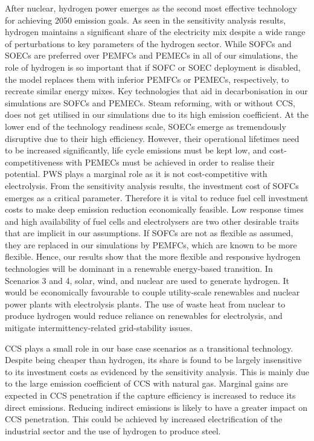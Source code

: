After nuclear, hydrogen power emerges as the second most effective technology for achieving 2050 emission goals. As seen in the sensitivity analysis results, hydrogen maintains a significant share of the electricity mix despite a wide range of perturbations to key parameters of the hydrogen sector. While \gls{SOFC}s and \gls{SOEC}s are preferred over \gls{PEMFC}s and \gls{PEMEC}s in all of our simulations, the role of hydrogen is so important that if \gls{SOFC} or \gls{SOEC} deployment is disabled, the model replaces them with inferior \gls{PEMFC}s or \gls{PEMEC}s, respectively, to recreate similar energy mixes. Key technologies that aid in decarbonisation in our simulations are \gls{SOFC}s and \gls{PEMEC}s. Steam reforming, with or without CCS, does not get utilised in our simulations due to its high emission coefficient. At the lower end of the technology readiness scale, \gls{SOEC}s emerge as tremendously disruptive due to their high efficiency. However, their operational lifetimes need to be increased significantly, life cycle emissions must be kept low, and cost-competitiveness with \gls{PEMEC}s must be achieved in order to realise their potential. \gls{PWS} plays a marginal role as it is not cost-competitive with electrolysis. From the sensitivity analysis results, the investment cost of \gls{SOFC}s emerges as a critical parameter. Therefore it is vital to reduce fuel cell investment costs to make deep emission reduction economically feasible. Low response times and high availability of fuel cells and electrolysers are two other desirable traits that are implicit in our assumptions. If \gls{SOFC}s are not as flexible as assumed, they are replaced in our simulations by \gls{PEMFC}s, which are known to be more flexible. Hence, our results show that the more flexible and responsive hydrogen technologies will be dominant in a renewable energy-based transition. In Scenarios 3 and 4, solar, wind, and nuclear are used to generate hydrogen. It would be economically favourable to couple utility-scale renewables and nuclear power plants with electrolysis plants. The use of waste heat from nuclear to produce hydrogen would reduce reliance on renewables for electrolysis, and mitigate intermittency-related grid-stability issues.

CCS plays a small role in our base case scenarios as a transitional technology. Despite being cheaper than hydrogen, its share is found to be largely insensitive to its investment costs as evidenced by the sensitivity analysis. This is mainly due to the large emission coefficient of \gls{CCS} with natural gas. Marginal gains are expected in \gls{CCS} penetration if the capture efficiency is increased to reduce its direct emissions. Reducing indirect emissions is likely to have a greater impact on \gls{CCS} penetration. This could be achieved by increased electrification of the industrial sector and the use of hydrogen to produce steel.

